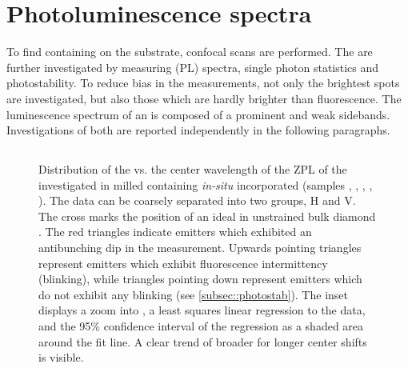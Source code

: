 


\section{Photoluminescence spectra} \label{subsec::spectra}


To find \nds containing \sivs on the substrate, confocal scans are performed.
The \sivs are further investigated by measuring \pl (PL) spectra, single photon statistics and photostability.
To reduce bias in the measurements, not only the brightest spots are investigated, but also those which are hardly brighter than \bkg fluorescence.
The luminescence spectrum of an \siv is composed of a prominent \zpl and weak sidebands.
Investigations of both are reported independently in the following paragraphs.



\subsection{\Zpl}\label{subsubsec::zpl}
	

	\begin{figure}[tp]
		\centering
		\caption{Distribution of the \lw vs. the center wavelength of the ZPL of the investigated \sivs in milled \nds containing \textit{in-situ} incorporated \sivs (samples \insituF, \insituS, \insituSn, \insituSo, \insituH{}). The data can be coarsely separated into two groups, H and V. The cross marks the position of an ideal \siv in unstrained bulk diamond \cite{Arend2016a}. The red triangles indicate emitters which exhibited an antibunching dip in the \gtz measurement. Upwards pointing triangles represent emitters which exhibit fluorescence intermittency (blinking), while triangles pointing down represent emitters which do not exhibit any blinking (see \autoref{subsec::photostab}). The inset displays a zoom into \gv, a least squares linear regression to the data, and the 95\% confidence interval of the regression as a shaded area around the fit line. A clear trend of broader \lws for longer \ZPL center shifts is visible.}
		\label{fig::bimodal_distr}
	\end{figure}


